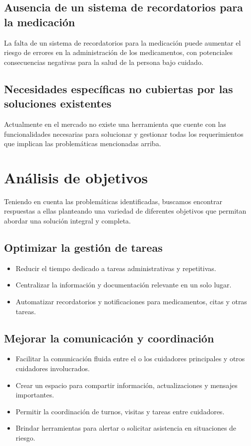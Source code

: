 \documentclass[a4paper,12pt]{article}
\begin{document}
    \subsection{Ausencia de un sistema de recordatorios para la medicación}
    La falta de un sistema de recordatorios para la medicación puede aumentar el riesgo de errores en la administración de los medicamentos, con potenciales consecuencias negativas para la salud de la persona bajo cuidado.
    \subsection{Necesidades específicas no cubiertas por las soluciones existentes}
    Actualmente en el mercado no existe una herramienta que cuente con las funcionalidades necesarias para solucionar y gestionar todas los requerimientos que implican las problemáticas mencionadas arriba. 

    \newpage

    \section{Análisis de objetivos}
    Teniendo en cuenta las problemáticas identificadas, buscamos encontrar respuestas a ellas planteando una variedad de diferentes objetivos que permitan abordar una solución integral y completa.
    \subsection{Optimizar la gestión de tareas}
    \begin{itemize}
        \item Reducir el tiempo dedicado a tareas administrativas y repetitivas.
        \item Centralizar la información y documentación relevante en un solo lugar.
        \item Automatizar recordatorios y notificaciones para medicamentos, citas y otras tareas.
    \end{itemize}
    \subsection{Mejorar la comunicación y coordinación}
    \begin{itemize}
        \item Facilitar la comunicación fluida entre el o los cuidadores principales y otros cuidadores involucrados.
        \item Crear un espacio para compartir información, actualizaciones y mensajes importantes.
        \item Permitir la coordinación de turnos, visitas y tareas entre cuidadores.
        \item Brindar herramientas para alertar o solicitar asistencia en situaciones de riesgo.
    \end{itemize}
\end{document}
